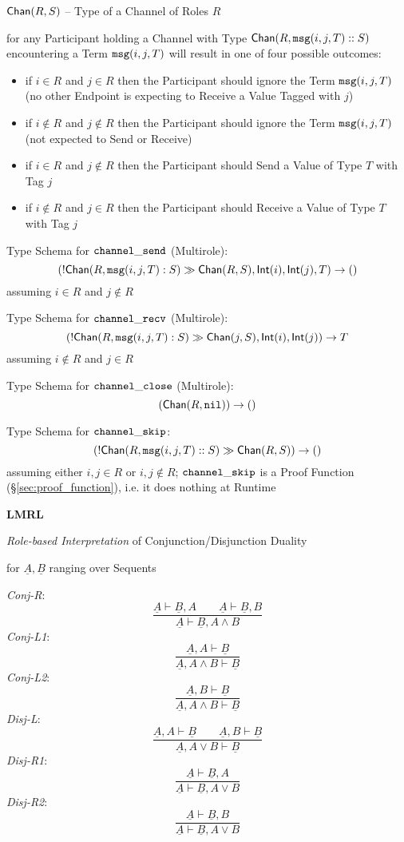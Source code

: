 $\mathsf{Chan}(R,S)$ -- Type of a Channel of Roles $R$

for any Participant holding a Channel with Type $\mathsf{Chan}(R,
\mathtt{msg}(i,j,T)::S)$ encountering a Term $\mathtt{msg}(i,j,T)$ will result in one
of four possible outcomes:
\begin{itemize}
  \item if $i \in R$ and $j \in R$ then the Participant should ignore
    the Term $\mathtt{msg}(i,j,T)$ (no other Endpoint is expecting to Receive
    a Value Tagged with $j$)
  \item if $i \notin R$ and $j \notin R$ then the Participant should
    ignore the Term $\mathtt{msg}(i,j,T)$ (not expected to Send or Receive)
  \item if $i \in R$ and $j \notin R$ then the Participant should Send
    a Value of Type $T$ with Tag $j$
  \item if $i \notin R$ and $j \in R$ then the Participant should
    Receive a Value of Type $T$ with Tag $j$
\end{itemize}

Type Schema for $\mathtt{channel\_send}$ (Multirole):
\[
  (!\mathsf{Chan} (R, \mathtt{msg}(i,j,T):S) \gg \mathsf{Chan}(R,S), \mathsf{Int}(i), \mathsf{Int}(j), T)
    \rightarrow \mathsf{()}
\]
assuming $i \in R$ and $j \notin R$

Type Schema for $\mathtt{channel\_recv}$ (Multirole):
\[
  (!\mathsf{Chan} (R, \mathtt{msg}(i,j,T):S) \gg \mathsf{Chan}(j,S), \mathsf{Int}(i), \mathsf{Int}(j))
    \rightarrow T
\]
assuming $i \notin R$ and $j \in R$

Type Schema for $\mathtt{channel\_close}$ (Multirole):
\[
  (\mathsf{Chan}(R, \mathtt{nil})) \rightarrow \mathsf{()}
\]

Type Schema for $\mathtt{channel\_skip}$:
\[
  (!\mathsf{Chan}(R,\mathtt{msg}(i,j,T)::S) \gg \mathsf{Chan}(R,S)) \rightarrow \mathsf{()}
\]
assuming either $i,j \in R$ or $i,j \notin R$; $\mathtt{channel\_skip}$ is a
Proof Function (\S\ref{sec:proof_function}), i.e. it does nothing at
Runtime


\textbf{LMRL}

\emph{Role-based Interpretation} of Conjunction/Disjunction Duality

for $\underline{A},\underline{B}$ ranging over Sequents

\emph{Conj-R}:
\[
  \frac {\underline{A} \vdash \underline{B},A \quad\quad
    \underline{A} \vdash \underline{B},B}
  {\underline{A} \vdash \underline{B},A \wedge B}
\]
\emph{Conj-L1}:
\[
  \frac {\underline{A},A \vdash \underline{B}}
  {\underline{A},A \wedge B \vdash \underline{B}}
\]
\emph{Conj-L2}:
\[
  \frac {\underline{A},B \vdash \underline{B}}
  {\underline{A},A \wedge B \vdash \underline{B}}
\]
\emph{Disj-L}:
\[
  \frac {\underline{A},A \vdash \underline{B} \quad\quad
    \underline{A},B \vdash \underline{B}}
  {\underline{A},A \vee B \vdash \underline{B}}
\]
\emph{Disj-R1}:
\[
  \frac {\underline{A} \vdash \underline{B},A}
  {\underline{A} \vdash \underline{B}, A \vee B}
\]
\emph{Disj-R2}:
\[
  \frac {\underline{A} \vdash \underline{B},B}
  {\underline{A} \vdash \underline{B}, A \vee B}
\]

